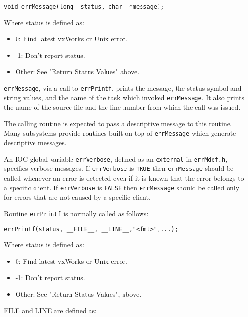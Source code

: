 \begin{verbatim}void errMessage(long  status, char  *message);
\end{verbatim}Where status is defined as:

\begin{itemize}\item 0:  Find latest vxWorks or Unix error.

\item -1:  Don't report status.

\item Other:  See "Return Status Values" above.

\end{itemize}\verb|errMessage|, via a call to \verb|errPrintf|, prints the message, the status symbol and string values, and the name of the task 
which invoked \verb|errMessage|. It also prints the name of the source file and the line number from which the call was 
issued.

The calling routine is expected to pass a descriptive message to this routine. Many subsystems provide routines built on 
top of \verb|errMessage| which generate descriptive messages. 

An IOC global variable \verb|errVerbose|, defined as an \verb|external| in \verb|errMdef.h|, specifies verbose messages. If 
\verb|errVerbose| is \verb|TRUE| then \verb|errMessage| should be called whenever an error is detected even if it is known that the 
error belongs to a specific client. If \verb|errVerbose| is \verb|FALSE| then \verb|errMessage| should be called only for errors that are 
not caused by a specific client.

Routine \verb|errPrintf| is normally called as follows:

\begin{verbatim}errPrintf(status, __FILE__, __LINE__,"<fmt>",...);
\end{verbatim}Where status is defined as:

\begin{itemize}\item 0:  Find latest vxWorks or Unix error.

\item -1:  Don't report status.

\item Other:  See "Return Status Values", above.

\end{itemize}FILE and LINE are defined as:

